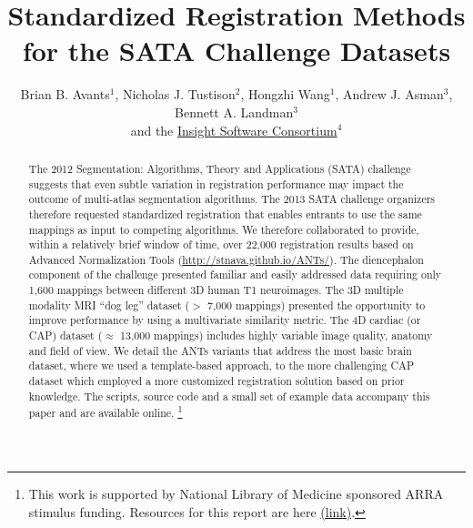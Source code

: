 \documentclass{llncs}
\begin{document}
\vspace{-0.1in}
\title{Standardized Registration Methods for the SATA Challenge Datasets}
\author{Brian B. Avants$^1$, Nicholas J. Tustison$^2$, Hongzhi
  Wang$^1$, Andrew J. Asman$^3$, Bennett A. Landman$^3$ \\and the
  \href{http://www.insightsoftwareconsortium.org/}{Insight
    Software Consortium}$^4$}
\maketitle              
\begin{abstract}
The 2012 Segmentation: Algorithms, Theory and Applications (SATA)
challenge suggests that even subtle variation in registration
performance may impact the outcome of multi-atlas segmentation
algorithms. The 2013 SATA challenge organizers therefore requested
standardized registration that enables entrants to use the same
mappings as input to competing algorithms.  We therefore collaborated
to provide, within a relatively brief window of time, over 22,000
registration results based on Advanced Normalization Tools
(\url{http://stnava.github.io/ANTs/}).
The diencephalon component of the challenge presented familiar and
easily addressed data requiring only 1,600 mappings between different
3D human T1 neuroimages.  The 3D multiple modality MRI ``dog leg'' dataset ($>$ 7,000
mappings) presented the opportunity to improve performance by using
a multivariate similarity metric.  The 4D cardiac (or CAP) dataset
($\approx$ 13,000 mappings) includes highly variable image quality, anatomy
and field of view.  We detail the ANTs variants that address the most basic brain dataset, where we used
a template-based approach, to the more challenging CAP dataset which
employed a more customized registration solution based on prior
knowledge.  The scripts, source code and a small set of example data
accompany this paper and are available online.  
\footnote{This work is supported by National Library of Medicine sponsored ARRA stimulus
funding. Resources for this report are here \href{https://github.com/stnava/KnobSock}{(link)}.}
\end{abstract}
\end{document}
